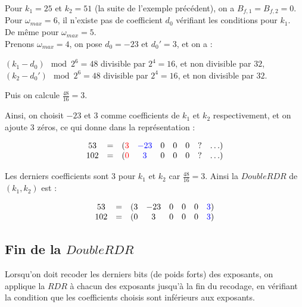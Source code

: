 \documentclass[12pt, a4paper]{memoir}
\begin{document}
 \begin{Exemple}
  Pour $k_1 = 25$ et $k_2 = 51$ (la suite de l'exemple précédent), on a $B_{f,1} = B_{f,2} = 0$. \\
  Pour $\omega_{max} = 6$, il n'existe pas de coefficient $d_0$ vérifiant les conditions pour $k_1$. \\
  De même pour $\omega_{max} = 5$. \\
  Prenons $\omega_{max} = 4$, on pose $d_0 = -23$ et $d_0' = 3$, et on a : \\
  \begin{center}
   $(k_1 - d_0) \mod 2^6 = 48$ divisible par $2^4 = 16$, et non divisible par $32$, \\
   $(k_2 - d_0') \mod 2^6 = 48$ divisible par $2^4 = 16$, et non divisible par $32$.
  \end{center}
  
  Puis on calcule $\frac{48}{16} = 3$.

  Ainsi, on choisit $-23$ et $3$ comme coefficients de $k_1$ et $k_2$ respectivement, et on ajoute $3$ zéros,
  ce qui donne dans la représentation :
  
 $$\begin{array}{ccccccccc}
  53 & = & (\textcolor{red}{3} & \textcolor{blue}{-23} & 0 & 0 & 0 & ? & \ldots) \\
  102 & = & (\textcolor{red}{0} & \textcolor{blue}{3} & 0 & 0 & 0 & ? & \ldots)
 \end{array}$$
 
 Les derniers coefficients sont $3$ pour $k_1$ et $k_2$ car $\frac{48}{16} = 3$. Ainsi la $DoubleRDR$ de $(k_1,k_2)$ est :
 
 $$\begin{array}{cccccccc}
  53 & = & (3 & -23 & 0 & 0 & 0 & \textcolor{blue}{3}) \\
  102 & = & (0 & 3 & 0 & 0 & 0 & \textcolor{blue}{3})
 \end{array}$$
 \end{Exemple}

 \subsection{Fin de la $DoubleRDR$}
 
 Lorsqu'on doit recoder les derniers bits (de poids forts) des exposants, on applique la $RDR$ à chacun des exposants
 jusqu'à la fin du recodage, en vérifiant la condition que les coefficients choisis sont inférieurs aux exposants.
 
\end{document}
